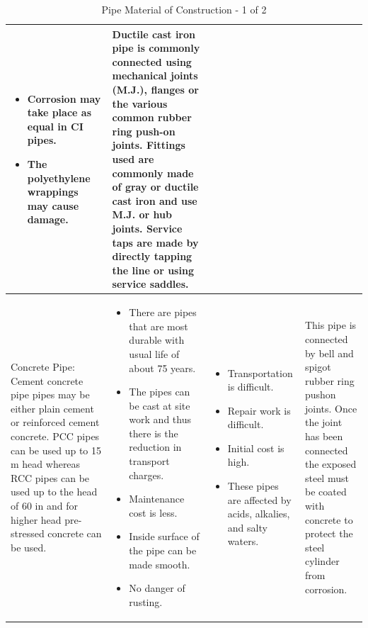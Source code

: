 \documentclass{article}
\begin{document}
\begin{table}[h!]
\begin{tabular}{| m{5cm} | m{5cm} | m{5cm} | m{5cm}|}
{\begin{itemize}[leftmargin=*, topsep=5pt, partopsep=0pt]
\item Corrosion may take place as equal in CI pipes.

\item The polyethylene wrappings may cause damage. 
  \end{itemize}}  
  
  & \scriptsize{Ductile cast iron pipe is commonly connected using
mechanical joints (M.J.), flanges or the various common rubber ring push-on joints. Fittings used are commonly made of gray or ductile cast iron and use M.J. or hub joints. Service taps are made by directly tapping the line or using service saddles.}
    \\ \hline
    
  
        \scriptsize{Concrete Pipe: Cement concrete pipe pipes may be either plain cement or reinforced cement concrete. PCC pipes can be used up to 15 m head whereas RCC pipes can be used up to the head of 60 in and for higher head pre-stressed concrete can be used.}
&
  \scriptsize{\begin{itemize}[leftmargin=*, topsep=5pt, partopsep=0pt]
  \item There are pipes that are most durable with usual life of about 75 years.

\item The pipes can be cast at site work and thus there is the reduction in transport charges.

\item Maintenance cost is less.

\item Inside surface of the pipe can be made smooth.

\item  No danger of rusting.
  \end{itemize}}  
    &
  \scriptsize{\begin{itemize}[leftmargin=*, topsep=5pt, partopsep=0pt]
  \item Transportation is difficult.

\item Repair work is difficult.

\item Initial cost is high.

\item These pipes are affected by acids, alkalies, and salty waters.
  \end{itemize}}  
  & \scriptsize{This pipe is connected by bell and spigot rubber ring pushon joints. Once the
joint has been connected the exposed steel must be coated with concrete to protect the steel cylinder from corrosion.}
    \\ \hline   
        \end{tabular}
        \caption{Pipe Material of Construction - 1 of 2}
   \label{table:PipelineMaterial1}
    \end{table}   
    
\end{document}
